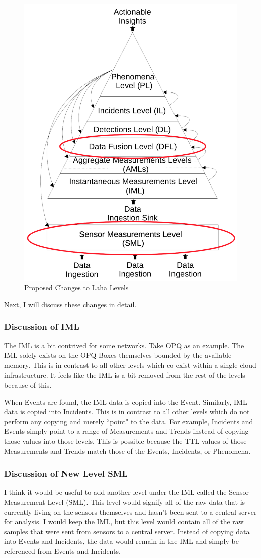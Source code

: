 \begin{figure}
    \centering
    \includegraphics[width=.60\linewidth]{figures/add_laha_levels.png}
    \caption{Proposed Changes to Laha Levels}
    \label{fig:add_laha_levels}
\end{figure}

Next, I will discuss these changes in detail.

\subsubsection{Discussion of IML}
The IML is a bit contrived for some networks. Take OPQ as an example. The IML solely exists on the OPQ Boxes themselves bounded by the available memory. This is in contrast to all other levels which co-exist within a single cloud infrastructure. It feels like the IML is a bit removed from the rest of the levels because of this.

When Events are found, the IML data is copied into the Event. Similarly, IML data is copied into Incidents. This is in contrast to all other levels which do not perform any copying and merely ``point" to the data. For example, Incidents and Events simply point to a range of Measurements and Trends instead of copying those values into those levels. This is possible because the TTL values of those Measurements and Trends match those of the Events, Incidents, or Phenomena.

\subsubsection{Discussion of New Level SML}
I think it would be useful to add another level under the IML called the Sensor Measurement Level (SML). This level would signify all of the raw data that is currently living on the sensors themselves and hasn't been sent to a central server for analysis. I would keep the IML, but this level would contain all of the raw samples that were sent from sensors to a central server. Instead of copying data into Events and Incidents, the data would remain in the IML and simply be referenced from Events and Incidents.

